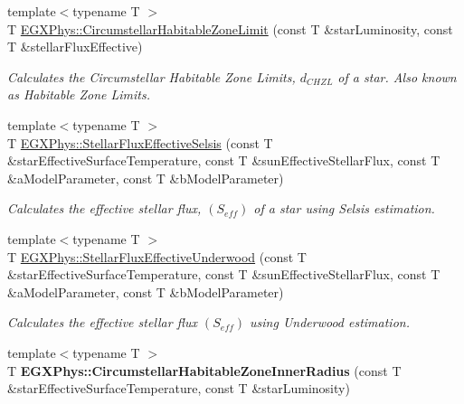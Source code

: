 \begin{DoxyCompactItemize}
\item 
{\footnotesize template$<$typename T $>$ }\\T \mbox{\hyperlink{group___e_g_x_phys-_circumstellar_habitable_zone_limit_ga23a8f602461ea3257e8767b1d455c383}{E\+G\+X\+Phys\+::\+Circumstellar\+Habitable\+Zone\+Limit}} (const T \&star\+Luminosity, const T \&stellar\+Flux\+Effective)
\begin{DoxyCompactList}\small\item\em Calculates the Circumstellar Habitable Zone Limits, $d_{CHZL}$ of a star. Also known as Habitable Zone Limits. \end{DoxyCompactList}\item 
{\footnotesize template$<$typename T $>$ }\\T \mbox{\hyperlink{group___e_g_x_phys-_circumstellar_habitable_zone_limit_ga3ce3a04fec7b1c8fb66ac54270ce3902}{E\+G\+X\+Phys\+::\+Stellar\+Flux\+Effective\+Selsis}} (const T \&star\+Effective\+Surface\+Temperature, const T \&sun\+Effective\+Stellar\+Flux, const T \&a\+Model\+Parameter, const T \&b\+Model\+Parameter)
\begin{DoxyCompactList}\small\item\em Calculates the effective stellar flux, $(S_{eff})$ of a star using Selsis estimation. \end{DoxyCompactList}\item 
{\footnotesize template$<$typename T $>$ }\\T \mbox{\hyperlink{group___e_g_x_phys-_circumstellar_habitable_zone_limit_ga34d1e39bce17904bc6d383f1935c79d6}{E\+G\+X\+Phys\+::\+Stellar\+Flux\+Effective\+Underwood}} (const T \&star\+Effective\+Surface\+Temperature, const T \&sun\+Effective\+Stellar\+Flux, const T \&a\+Model\+Parameter, const T \&b\+Model\+Parameter)
\begin{DoxyCompactList}\small\item\em Calculates the effective stellar flux $(S_{eff})$ using Underwood estimation. \end{DoxyCompactList}\item 
\mbox{\label{_circumstellar_habitable_zone_8inl_abcc7fdd3086efb4c0b786960a45c02e2}} 
{\footnotesize template$<$typename T $>$ }\\T {\bfseries E\+G\+X\+Phys\+::\+Circumstellar\+Habitable\+Zone\+Inner\+Radius} (const T \&star\+Effective\+Surface\+Temperature, const T \&star\+Luminosity)
\item 

\end{DoxyCompactItemize}
